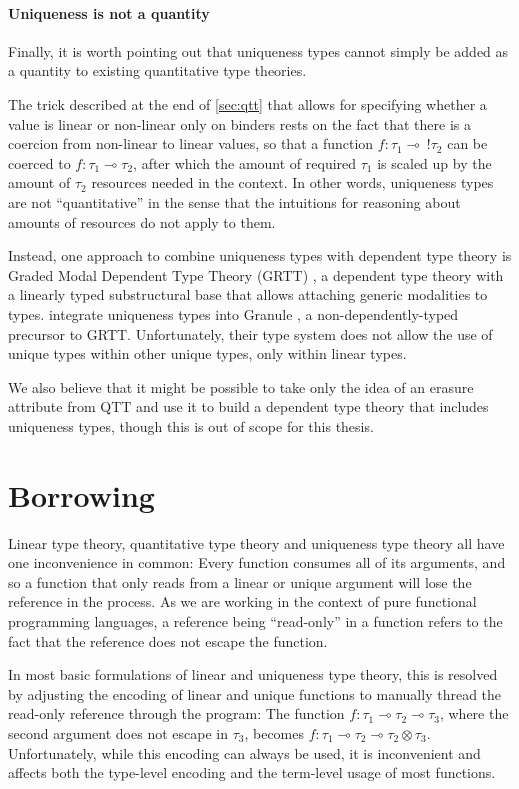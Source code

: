 \paragraph{Uniqueness is not a quantity} Finally, it is worth pointing out that uniqueness types cannot simply be added as a quantity to existing quantitative type theories. 

The trick described at the end of \cref{sec:qtt} that allows for specifying whether a value is linear or non-linear only on binders rests on the fact that there is a coercion from non-linear to linear values, so that a function $f : \tau_1 \multimap\ !\tau_2$ can be coerced to $f : \tau_1 \multimap \tau_2$, after which the amount of required $\tau_1$ is scaled up by the amount of $\tau_2$ resources needed in the context. In other words, uniqueness types are not ``quantitative'' in the sense that the intuitions for reasoning about amounts of resources do not apply to them.

Instead, one approach to combine uniqueness types with dependent type theory is Graded Modal Dependent Type Theory (GRTT) \citep{moon_graded_2021}, a dependent type theory with a linearly typed substructural base that allows attaching generic modalities to types. \cite{sergey_linearity_2022} integrate uniqueness types into Granule \citep{orchard_quantitative_2019}, a non-dependently-typed precursor to GRTT. Unfortunately, their type system does not allow the use of unique types within other unique types, only within linear types. 

We also believe that it might be possible to take only the idea of an erasure attribute from QTT and use it to build a dependent type theory that includes uniqueness types, though this is out of scope for this thesis.

\section{Borrowing}\label{sec:borrowingbackground}
Linear type theory, quantitative type theory and uniqueness type theory all have one inconvenience in common: Every function consumes all of its arguments, and so a function that only reads from a linear or unique argument will lose the reference in the process. As we are working in the context of pure functional programming languages, a reference being ``read-only'' in a function refers to the fact that the reference does not escape the function.

In most basic formulations of linear and uniqueness type theory, this is resolved by adjusting the encoding of linear and unique functions to manually thread the read-only reference through the program: The function $f : \tau_1 \multimap \tau_2 \multimap \tau_3$, where the second argument does not escape in $\tau_3$, becomes $f : \tau_1 \multimap \tau_2 \multimap \tau_2 \otimes \tau_3$. Unfortunately, while this encoding can always be used, it is inconvenient and affects both the type-level encoding and the term-level usage of most functions. 

